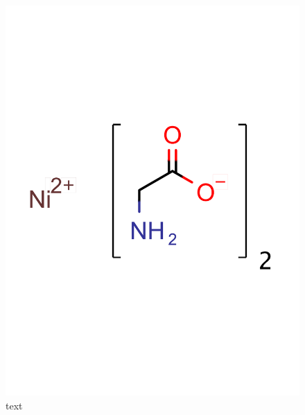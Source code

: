 \documentclass[fleqn,10pt]{SelfArx} %
\begin{document}
    \begin{figure}[h]
    	\centering
    	\includegraphics[width=\linewidth]{images/Glicinato}
    	\caption{text}
    	\label{fig:glicinato}
    \end{figure}
\end{document}
